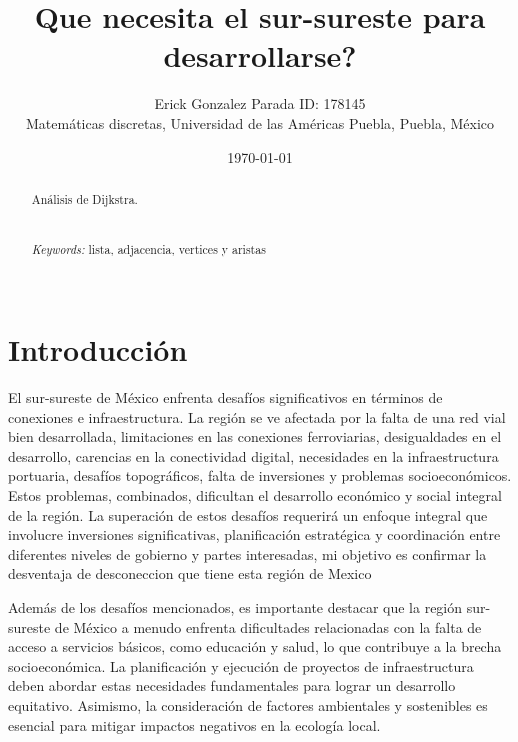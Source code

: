 \documentclass{article}
\begin{document}
\renewcommand{\footrulewidth}{1pt}
\renewcommand{\tablename}{Tabla}
\renewcommand{\figurename}{Figura}


\title{Que necesita el sur-sureste para desarrollarse?}
\author{\small{Erick Gonzalez Parada ID: 178145}\\
	   \small{Matemáticas discretas, Universidad de las Américas Puebla, Puebla, M\'exico}}
\date{\small{\today}}
\maketitle

\begin{abstract}
Análisis de Dijkstra.\\
\\
\\
{\it Keywords:}   lista, adjacencia, vertices y aristas   
\\
\\
\end{abstract}

\section{Introducción}\label{Introducción}
El sur-sureste de México enfrenta desafíos significativos en términos de conexiones e infraestructura. La región se ve afectada por la falta de una red vial bien desarrollada, limitaciones en las conexiones ferroviarias, desigualdades en el desarrollo, carencias en la conectividad digital, necesidades en la infraestructura portuaria, desafíos topográficos, falta de inversiones y problemas socioeconómicos. Estos problemas, combinados, dificultan el desarrollo económico y social integral de la región. La superación de estos desafíos requerirá un enfoque integral que involucre inversiones significativas, planificación estratégica y coordinación entre diferentes niveles de gobierno y partes interesadas, mi objetivo es confirmar la desventaja de desconeccion que tiene esta región de Mexico

Además de los desafíos mencionados, es importante destacar que la región sur-sureste de México a menudo enfrenta dificultades relacionadas con la falta de acceso a servicios básicos, como educación y salud, lo que contribuye a la brecha socioeconómica. La planificación y ejecución de proyectos de infraestructura deben abordar estas necesidades fundamentales para lograr un desarrollo equitativo. Asimismo, la consideración de factores ambientales y sostenibles es esencial para mitigar impactos negativos en la ecología local.
\end{document}
